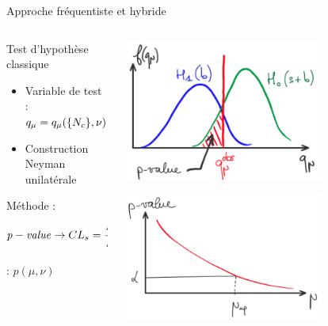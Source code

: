 \begin{frame}
\begin{varblock}[1.05\textwidth]{Approche fréquentiste et hybride}
\begin{columns}
\begin{column}{0.6\textwidth}
\begin{maliste}
\item Test d'hypothèse classique
\begin{itemize}
\item Variable de test : $q_\mu=q_\mu(\{N_{c}\},\nu)$
\item Construction Neyman unilatérale
\end{itemize}
\item Méthode \CLs{} :
\[{\it p-value} \rightarrow CL_s=\frac{P\left(q_\mu<q_\mu^{\text{obs}}|H_0\right)}{P\left(q_\mu<q_\mu^{\text{obs}}|H_1\right)}\]
\item \pval{} : $p\left(\mu,\nu\right)$
\end{maliste}
\end{column}
\begin{column}{0.4\textwidth}
\begin{center}
\vspace*{-0.7cm}
\includegraphics[width=0.7\textwidth]{Figures/Stat/pValueIllustration_cropped.png}
\end{center}
\begin{center}
\vspace*{-0.2cm}
\includegraphics[width=0.7\textwidth]{Figures/Stat/NeymanConstruction1D_cropped.png}
\end{center}
\end{column}
\end{columns}
\end{varblock}
\end{frame}

